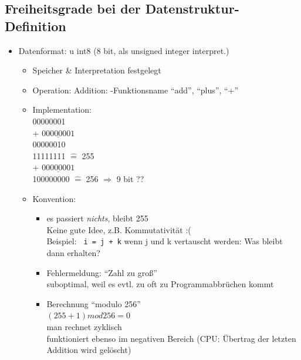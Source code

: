 \documentclass[11pt, fleqn]{scrreprt}
\begin{document}
\subsection*{Freiheitsgrade bei der Datenstruktur-Definition}

\begin{itemize}[label={$\bullet$}]
    \item Datenformat: u int8 (8 bit, als unsigned integer interpret.)
    \begin{itemize}[label={-}]
        \item Speicher \& Interpretation festgelegt
        \item Operation: Addition: -Funktionsname ``add'', ``plus'', ``+''
        \item Implementation:  \\
        \hspace*{0.5cm}00000001 \\
        \hspace*{0.05cm} + $\underline{ 00000001}$ \\
        \hspace*{0.5cm}00000010\\

        \hspace*{0.5cm}11111111 $\widehat{=}$ 255 \\
        \hspace*{0.05cm} + $\underline{00000001}$ \\
        \hspace*{0.25cm} 100000000 $\widehat{=}$ 256 $\Rightarrow$ 9 bit ?? \\

        \item Konvention:
        \begin{itemize}[label={-}]
            \item es passiert \emph{nichts}, bleibt 255 \\
            Keine gute Idee, z.B. Kommutativität :( \\
            Beispiel: \verb| i = j + k| wenn j und k vertauscht werden: Was bleibt dann erhalten?
            \item Fehlermeldung: ``Zahl zu groß'' \\
            suboptimal, weil es evtl. zu oft zu Programmabbrüchen kommt
            \item Berechnung ``modulo 256'' \\
            $(255+1)mod256 = 0$ \\
            man rechnet zyklisch \\
            funktioniert ebenso im negativen Bereich
            (CPU: Übertrag der letzten Addition wird gelöscht)
        \end{itemize}
    \end{itemize}
\end{itemize}
\end{document}
